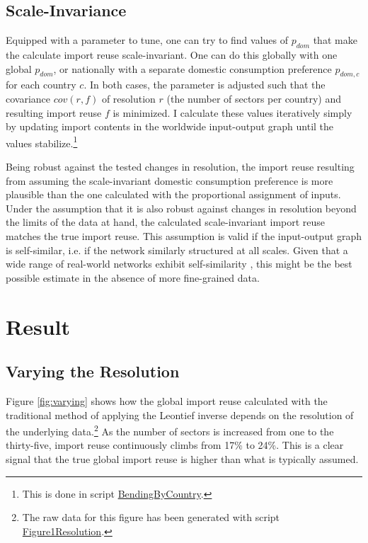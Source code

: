 \documentclass[english]{uzhpub}
\begin{document}
\subsection{Scale-Invariance}
\label{met:scale-invariance}
Equipped with a parameter to tune, one can try to find values of $p_{dom}$ that make the calculate import reuse scale-invariant. One can do this globally with one global $p_{dom}$, or nationally with a separate domestic consumption preference $p_{dom,c}$ for each country $c$. In both cases, the parameter is adjusted such that the covariance $cov(r, f)$ of resolution $r$ (the number of sectors per country) and resulting import reuse $f$ is minimized. I calculate these values iteratively simply by updating import contents in the worldwide input-output graph until the values stabilize.\footnote{This is done in script \href{https://github.com/kronrod/importreuse/blob/master/src/com/meissereconomics/seminar/run/BendingByCountry.java}{BendingByCountry}.}

Being robust against the tested changes in resolution, the import reuse resulting from assuming the scale-invariant domestic consumption preference is more plausible than the one calculated with the proportional assignment of inputs. Under the assumption that it is also robust against changes in resolution beyond the limits of the data at hand, the calculated scale-invariant import reuse matches the true import reuse. This assumption is valid if the input-output graph is self-similar, i.e. if the network similarly structured at all scales. Given that a wide range of real-world networks exhibit self-similarity \cite{song2005self}, this might be the best possible estimate in the absence of more fine-grained data.

\section{Result}
\label{sec:result}

\subsection{Varying the Resolution}
\label{res:varying}

Figure \ref{fig:varying} shows how the global import reuse calculated with the traditional method of applying the Leontief inverse depends on the resolution of the underlying data.\footnote{The raw data for this figure has been generated with script \href{https://github.com/kronrod/importreuse/blob/master/src/com/meissereconomics/seminar/run/Figure1Resolution.java}{Figure1Resolution}.} As the number of sectors is increased from one to the thirty-five, import reuse continuously climbs from 17\% to 24\%. This is a clear signal that the true global import reuse is higher than what is typically assumed.
\end{document}
